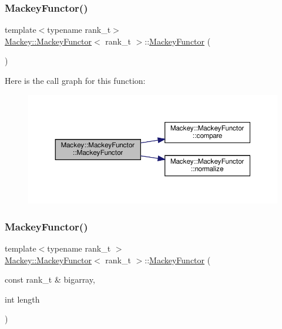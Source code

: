 \subsubsection{\texorpdfstring{Mackey\+Functor()}{MackeyFunctor()}\hspace{0.1cm}{\footnotesize\ttfamily [1/2]}}
{\footnotesize\ttfamily template$<$typename rank\+\_\+t$>$ \\
\hyperlink{classMackey_1_1MackeyFunctor}{Mackey\+::\+Mackey\+Functor}$<$ rank\+\_\+t $>$\+::\hyperlink{classMackey_1_1MackeyFunctor}{Mackey\+Functor} (\begin{DoxyParamCaption}{ }\end{DoxyParamCaption})\hspace{0.3cm}{\ttfamily [inline]}}

Here is the call graph for this function\+:\nopagebreak
\begin{figure}[H]
\begin{center}
\leavevmode
\includegraphics[width=350pt]{classMackey_1_1MackeyFunctor_a075cd364217700d5f5c2459d4a988a93_cgraph}
\end{center}
\end{figure}
\mbox{\label{classMackey_1_1MackeyFunctor_a7cdc1be794a7b39e7d4b86c2ad26355e}} 
\subsubsection{\texorpdfstring{Mackey\+Functor()}{MackeyFunctor()}\hspace{0.1cm}{\footnotesize\ttfamily [2/2]}}
{\footnotesize\ttfamily template$<$typename rank\+\_\+t $>$ \\
\hyperlink{classMackey_1_1MackeyFunctor}{Mackey\+::\+Mackey\+Functor}$<$ rank\+\_\+t $>$\+::\hyperlink{classMackey_1_1MackeyFunctor}{Mackey\+Functor} (\begin{DoxyParamCaption}\item[{const rank\+\_\+t \&}]{bigarray,  }\item[{int}]{length }\end{DoxyParamCaption})}



